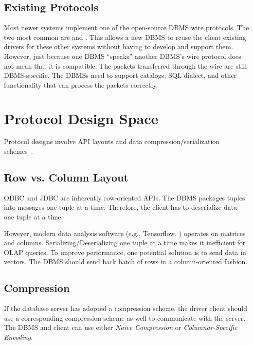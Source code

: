 \documentclass[11pt]{article}
\begin{document}
\subsection*{Existing Protocols}
Most newer systems implement one of the open-source DBMS wire protocols. The two most common are 
 and . This allows a new DBMS to reuse the client existing drivers for 
these other systems without having to develop and support them. However, just because one DBMS 
``speaks'' another DBMS's wire protocol does not mean that it is compatible. The packets transferred 
through the wire are still DBMS-specific. The DBMSs need to support catalogs, SQL dialect, and 
other functionality that can process the packets correctly.

\section{Protocol Design Space}
Protocol designs involve API layouts and data compression/serialization 
schemes~\cite{p1022-muehleisen}.

\subsection*{Row vs. Column Layout}
ODBC and JDBC are inherently row-oriented APIs. The DBMS packages tuples into messages one tuple 
at a time. Therefore, the client has to deserialize data one tuple at a time. 

However, modern data analysis software (e.g., Tensorflow, ) operates on matrices and 
columns. Serializing/Deserializing one tuple at a time makes it inefficient for OLAP queries. To 
improve performance, one potential solution is to send data in vectors. The DBMS should send back 
batch of rows in a column-oriented fashion.

\subsection*{Compression}
If the database server has adopted a compression scheme, the driver client should use a 
corresponding compression scheme as well to communicate with the server. The DBMS and client can use 
either \textit{Naive Compression} or \textit{Columnar-Specific Encoding}.
\end{document}
